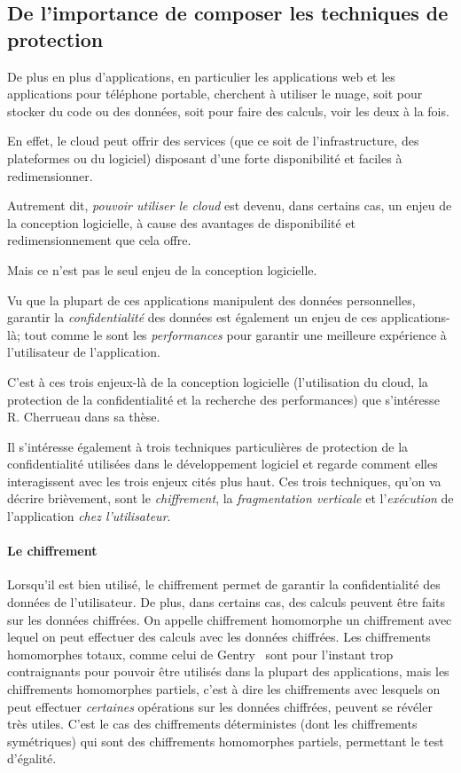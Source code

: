 \subsection{De l'importance de composer les techniques de protection}

De plus en plus d'applications, en particulier
les applications web et les applications pour téléphone portable,
cherchent à utiliser le nuage, soit pour stocker du code ou des données, 
soit pour faire des calculs,
voir les deux à la fois.

En effet, le cloud peut offrir des services (que ce soit de l'infrastructure,
des plateformes ou du logiciel) disposant d'une forte disponibilité et faciles à redimensionner.

Autrement dit, \emph{pouvoir utiliser le cloud} 
est devenu, dans certains cas,
un enjeu de la conception logicielle,
à cause des avantages de disponibilité 
et redimensionnement que cela offre.

Mais ce n'est pas le seul enjeu de la conception
logicielle.

Vu que la plupart de ces applications manipulent 
des données personnelles, 
garantir la \emph{confidentialité} des données 
est également un enjeu de 
ces applications-là; 
tout comme le sont les \emph{performances} 
pour garantir
une meilleure expérience à l'utilisateur de l'application.

C'est à ces trois enjeux-là de la conception
logicielle (l'utilisation du cloud,
la protection de la confidentialité
et la recherche des performances)
que s'intéresse R. Cherrueau dans sa thèse.

Il s'intéresse également à trois techniques
particulières de protection de la confidentialité
utilisées dans le développement logiciel et regarde comment elles interagissent
avec les trois enjeux cités plus haut.
Ces trois techniques, qu'on va décrire brièvement, sont
	le \emph{chiffrement},
	la \emph{fragmentation verticale} et
	l'\emph{exécution} de l'application \emph{chez l'utilisateur}.

\paragraph{Le chiffrement}
Lorsqu'il est bien utilisé, le chiffrement permet de garantir la confidentialité
des données de l'utilisateur.
De plus, dans certains cas, des calculs peuvent être faits sur les données chiffrées.
On appelle chiffrement homomorphe un chiffrement avec lequel on peut effectuer des calculs
avec les données chiffrées. Les chiffrements homomorphes totaux, comme celui de
Gentry~\cite{gentry:total} sont pour l'instant trop contraignants pour pouvoir être utilisés
dans la plupart des applications, mais les chiffrements homomorphes partiels,
c'est à dire les chiffrements avec lesquels on peut effectuer \emph{certaines}
opérations sur les données chiffrées, peuvent se révéler très utiles.
C'est le cas des chiffrements déterministes (dont les chiffrements symétriques)
qui sont des chiffrements homomorphes partiels, permettant le test d'égalité.

